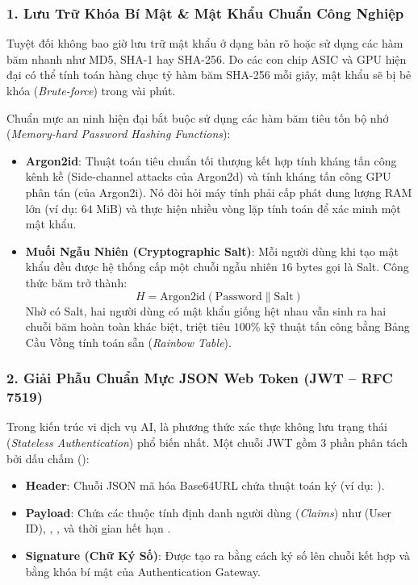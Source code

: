 \subsubsection{1. Lưu Trữ Khóa Bí Mật \& Mật Khẩu Chuẩn Công Nghiệp}
Tuyệt đối không bao giờ lưu trữ mật khẩu ở dạng bản rõ hoặc sử dụng các hàm băm nhanh như MD5, SHA-1 hay SHA-256. Do các con chip ASIC và GPU hiện đại có thể tính toán hàng chục tỷ hàm băm SHA-256 mỗi giây, mật khẩu sẽ bị bẻ khóa (\textit{Brute-force}) trong vài phút.

Chuẩn mực an ninh hiện đại bắt buộc sử dụng các hàm băm tiêu tốn bộ nhớ (\textit{Memory-hard Password Hashing Functions}):
\begin{itemize}
  \item \textbf{Argon2id}: Thuật toán tiêu chuẩn tối thượng kết hợp tính kháng tấn công kênh kề (Side-channel attacks của Argon2d) và tính kháng tấn công GPU phân tán (của Argon2i). Nó đòi hỏi máy tính phải cấp phát dung lượng RAM lớn (ví dụ: $64\text{ MiB}$) và thực hiện nhiều vòng lặp tính toán để xác minh một mật khẩu.
  \item \textbf{Muối Ngẫu Nhiên (Cryptographic Salt)}: Mỗi người dùng khi tạo mật khẩu đều được hệ thống cấp một chuỗi ngẫu nhiên $16\text{ bytes}$ gọi là Salt. Công thức băm trở thành:
  \begin{equation}
  H = \text{Argon2id}(\text{Password} \parallel \text{Salt})
  \end{equation}
  Nhờ có Salt, hai người dùng có mật khẩu giống hệt nhau vẫn sinh ra hai chuỗi băm hoàn toàn khác biệt, triệt tiêu $100\%$ kỹ thuật tấn công bằng Bảng Cầu Vồng tính toán sẵn (\textit{Rainbow Table}).
\end{itemize}

\subsubsection{2. Giải Phẫu Chuẩn Mực JSON Web Token (JWT -- RFC 7519)}
Trong kiến trúc vi dịch vụ AI,  là phương thức xác thực không lưu trạng thái (\textit{Stateless Authentication}) phổ biến nhất. Một chuỗi JWT gồm 3 phần phân tách bởi dấu chấm ():
\begin{center}
\end{center}
\begin{itemize}
  \item \textbf{Header}: Chuỗi JSON mã hóa Base64URL chứa thuật toán ký (ví dụ: ).
  \item \textbf{Payload}: Chứa các thuộc tính định danh người dùng (\textit{Claims}) như  (User ID), , , và thời gian hết hạn .
  \item \textbf{Signature (Chữ Ký Số)}: Được tạo ra bằng cách ký số lên chuỗi kết hợp  và  bằng khóa bí mật của Authentication Gateway.
\end{itemize}

